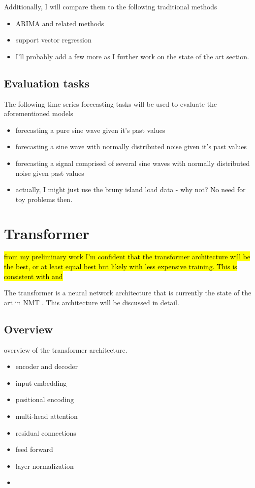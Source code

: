 Additionally, I will compare them to the following traditional methods
\begin{itemize}
	\item ARIMA and related methods
	\item support vector regression
	\item I'll probably add a few more as I further work on the state of the art section.
\end{itemize}

\subsection{Evaluation tasks}
The following time series forecasting tasks will be used to evaluate the aforementioned models
\begin{itemize}
	\item forecasting a pure sine wave given it's past values
	\item forecasting a sine wave with normally distributed noise given it's past values
	\item forecasting a signal comprised of several sine waves with normally distributed noise given past values
	\item actually, I might just use the bruny island load data - why not? No need for toy problems then.
\end{itemize}


\section{Transformer}
\hl{from my preliminary work I'm confident that the transformer architecture will be the best, or at least equal best but likely with less expensive training. This is consistent with \protect\cite{Song2017} and \protect\cite{Vaswani2017}}\\
\par
The transformer is a neural network architecture that is currently the state of the art in NMT \citep{Vaswani2017}.
This architecture will be discussed in detail. 

\subsection{Overview}
overview of the transformer architecture.
\begin{itemize}
	\item encoder and decoder
	\item input embedding
	\item positional encoding
	\item multi-head attention
	\item residual connections
	\item feed forward
	\item layer normalization
	\item 
\end{itemize}

